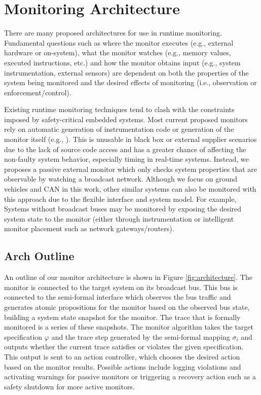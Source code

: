 
\section{Monitoring Architecture}
There are many proposed architectures for use in runtime monitoring. Fundamental questions such as where the monitor executes (e.g., external hardware or on-system), what the monitor watches (e.g., memory values, executed instructions, etc.) and how the monitor obtains input (e.g., system instrumentation, external sensors) are dependent on both the properties of the system being monitored and the desired effects of monitoring (i.e., observation or enforcement/control).  

Existing runtime monitoring techniques tend to clash with the constraints imposed by safety-critical embedded systems. 
Most current proposed monitors rely on automatic generation of instrumentation code or generation of the monitor itself (e.g., \cite{Havelund2002, Pike2011}).
This is unusable in black box or external supplier scenarios due to the lack of source code access and has a greater chance of affecting the non-faulty system behavior, especially timing in real-time systems.
Instead, we proposes a passive external monitor which only checks system properties that are observable by watching a broadcast network.
Although we focus on ground vehicles and CAN in this work, other similar systems can also be monitored with this approach due to the flexible interface and system model.
For example, Systems without broadcast buses may be monitored by exposing the desired system state to the monitor (either through instrumentation or intelligent monitor placement such as network gateways/routers).

\subsection{Arch Outline}
An outline of our monitor architecture is shown in Figure \ref{fig:architecture}. The monitor is connected to the target system on its broadcast bus. This bus is connected to the semi-formal interface which observes the bus traffic and generates atomic propositions for the monitor based on the observed bus state, building a system state snapshot for the monitor. 
The trace that is formally monitored is a series of these snapshots. The monitor algorithm takes the target specification $\varphi$ and the trace step generated by the semi-formal mapping $\sigma_i$ and outputs whether the current trace satisfies or violates the given specification. 
This output is sent to an action controller, which chooses the desired action based on the monitor results. Possible actions include logging violations and activating warnings for passive monitors or triggering a recovery action such as a safety shutdown for more active monitors.

